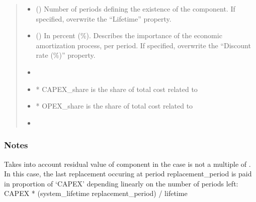 \documentclass[letterpaper,10pt,english]{sphinxmanual}
\begin{document}
\begin{fulllineitems}
\begin{fulllineitems}
\begin{quote}
\begin{description}
\begin{itemize}
\item {} 
\sphinxAtStartPar
{} (\sphinxstyleliteralemphasis{\sphinxupquote{, }}) \textendash{} Number of periods defining the existence of the component.
If specified, overwrite the “Lifetime” property.

\item {} 
\sphinxAtStartPar
{} () \textendash{} In percent (\%). Describes the importance of the economic amortization process, per period.
If specified, overwrite the “Discount rate (\%)” property.

\end{itemize}

\sphinxAtStartPar
\begin{itemize}
\item {} 
\sphinxAtStartPar
{}

\item {} 
\sphinxAtStartPar
* CAPEX\_share is the share of total cost related to 

\item {} 
\sphinxAtStartPar
* OPEX\_share is the share of total cost related to 

\item {} 
\sphinxAtStartPar
{}

\end{itemize}


\end{description}\end{quote}
\subsubsection*{Notes}

\sphinxAtStartPar
Takes into account residual value of component in the case  is not a multiple of .
In this case, the last replacement occuring at period replacement\_period is paid in proportion of ‘CAPEX’
depending linearly on the number of periods left:
CAPEX * (system\_lifetime \sphinxhyphen{} replacement\_period) / lifetime


\end{fulllineitems}
\end{fulllineitems}
\end{document}
